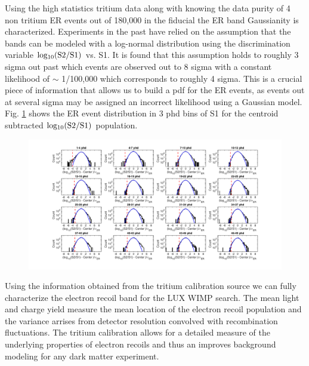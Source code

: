 
Using the high statistics tritium data along with knowing the data purity of 4 non tritium ER events out of 180,000 in the fiducial the ER band Gaussianity is characterized. Experiments in the past have relied on the assumption that the bands can be modeled with a log-normal distribution using the discrimination variable $\rm log_{10}(S2/S1)$ vs. S1. It is found that this assumption holds to roughly 3 sigma out past which events are observed out to 8 sigma with a constant likelihood of $\sim$ 1/100,000 which corresponds to  roughly 4 sigma. This is a crucial piece of information that allows us to build a pdf for the ER events, as events out at several sigma may be assigned an incorrect likelihood using a Gaussian model. Fig. \ref{fig:ER-Gauss} shows the ER event distribution in 3 phd bins of S1 for the centroid subtracted $\rm log_{10}(S2/S1)$ population.


\begin{figure}\centering
\includegraphics[width=150mm]{fig/Gaussianity/GaussER_all.png}
\caption{}
\label{fig:ER-Gauss}
\end{figure}

Using the information obtained from the tritium calibration source we can fully characterize the electron recoil band for the LUX WIMP search. The mean light and charge yield measure the mean location of the electron recoil population and the variance arrises from detector resolution convolved with recombination fluctuations. The tritium calibration allows for a detailed measure of the underlying properties of electron recoils and thus an improves background modeling for any dark matter experiment.

